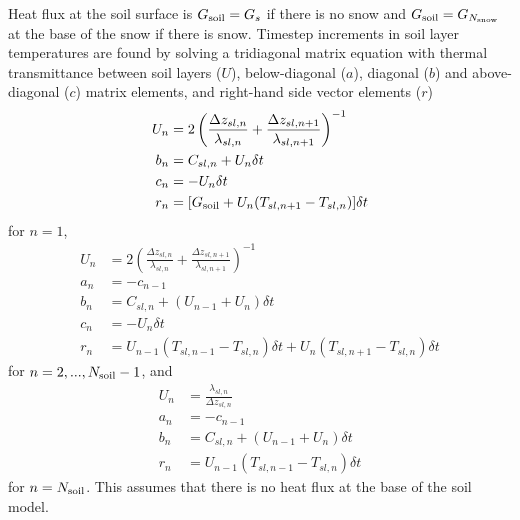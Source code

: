 \documentclass[fleqn]{article}
\begin{document}
Heat flux at the soil surface is $G_{\rm soil}=G_s$ if there is no snow and $G_{\rm soil} = G_{N_{\rm snow}}$ at the base of the snow if there is snow. Timestep increments in soil layer temperatures are found by solving a tridiagonal matrix equation with thermal transmittance between soil layers ($U$), below-diagonal ($a$), diagonal ($b$) and above-diagonal ($c$) matrix elements, and right-hand side vector elements ($r$)
\begin{align}
U_n &= 2\left(\frac{\Delta z_{sl,n}}{\lambda_{sl,n}} + \frac{\Delta z_{sl,n+1}}{\lambda_{sl,n+1}}\right)^{-1} \\
b_n &= C_{sl,n} + U_n\delta t \\
c_n &= -U_n\delta t \\
r_n &=  [G_{\rm soil} + U_n(T_{sl,n+1} - T_{sl,n})]\delta t
\end{align}
for $n=1$,
\begin{align}
U_n &= 2\left(\frac{\Delta z_{sl,n}}{\lambda_{sl,n}} + \frac{\Delta z_{sl,n+1}}{\lambda_{sl,n+1}}\right)^{-1} \\
a_n &= -c_{n-1} \\
b_n &= C_{sl,n} + (U_{n-1} + U_n)\delta t \\
c_n &= -U_n\delta t \\
r_n &= U_{n-1}(T_{sl,n-1} - T_{sl,n})\delta t + U_n(T_{sl,n+1} - T_{sl,n})\delta t
\end{align}
for $n=2,...,N_{\rm soil}-1$, and
\begin{align}
U_n &= \frac{\lambda_{sl,n}}{\Delta z_{sl,n}} \\
a_n &= -c_{n-1} \\
b_n &= C_{sl,n} + (U_{n-1} + U_n)\delta t \\
r_n &= U_{n-1}(T_{sl,n-1} - T_{sl,n})\delta t
\end{align}
for $n=N_{\rm soil}$. This assumes that there is no heat flux at the base of the soil model.
\end{document}
